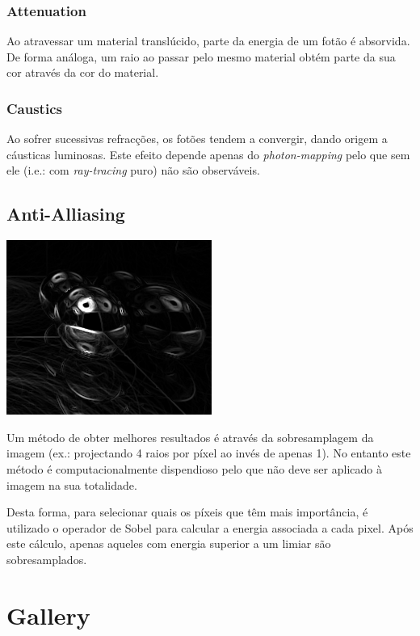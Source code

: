 \documentclass[a4paper]{article}
\begin{document}
\subsubsection{Attenuation}
\indent \indent Ao atravessar um material translúcido, parte da energia de um fotão é absorvida. De forma análoga,
um raio ao passar pelo mesmo material obtém parte da sua cor através da cor do material.

\subsubsection{Caustics}
\indent \indent Ao sofrer sucessivas refracções, os fotões tendem a convergir, dando origem a cáusticas luminosas.
Este efeito depende apenas do \emph{photon-mapping} pelo que sem ele (i.e.: com \emph{ray-tracing} puro)
não são observáveis.

\cleardoublepage
\subsection{Anti-Alliasing}
\begin{center}
	\includegraphics[scale=0.50]{images/sobel.png}
	\label{fig:sobel}
\end{center}

\indent Um método de obter melhores resultados é através da sobresamplagem da imagem (ex.: projectando
4 raios por píxel ao invés de apenas 1). No entanto este método é computacionalmente dispendioso pelo que não
deve ser aplicado à imagem na sua totalidade.

\indent Desta forma, para selecionar quais os píxeis que têm mais importância, é utilizado o operador de Sobel
para calcular a energia associada a cada pixel. Após este cálculo, apenas aqueles com energia superior a um limiar
são sobresamplados.

\cleardoublepage
\section{Gallery}
\end{document}
